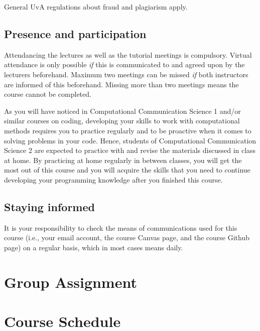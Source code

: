 \documentclass[a4paper,10pt,twocolumn]{report}
\begin{document}
	General UvA regulations about fraud and plagiarism apply.

	\section{Presence and participation}
	Attendancing the lectures as well as the tutorial meetings  is compulsory. Virtual attendance is only possible \emph{if} this is communicated to and agreed upon by the lecturers beforehand. Maximum two meetings can be missed \emph{if} both instructors are informed of this beforehand. Missing more than two meetings means the course cannot be completed. 
	
	As you will have noticed in Computational Communication Science 1 and/or similar courses on coding, developing your skills to work with computational methods requires you to practice regularly and to be proactive when it comes to solving problems in your code. Hence, students of Computational Communication Science 2 are expected to practice with and revise the materials discussed in class at home. By practicing at home regularly in between classes, you will get the most out of this course and you will acquire the skills that you need to continue developing your programming knowledge after you finished this course.
	
	\section{Staying informed}
	It is your responsibility to check the means of communications used for this course (i.e., your email account, the course Canvas page, and the course Github page) on a regular basis, which in most cases means daily.
	

	\chapter{Group Assignment}
\label{sec:groupassignment}

	
	
	\chapter{Course Schedule}
	
	
	
	
	
	
	
	
\end{document}
